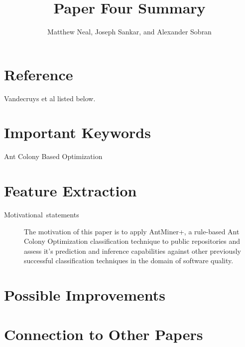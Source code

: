 \documentclass[english]{article}
\begin{document}
\title{Paper Four Summary}


\author{Matthew Neal, Joseph Sankar, and Alexander Sobran}

\maketitle

\section*{Reference}

Vandecruys et al \cite{Vandecruys08} listed below.


\section*{Important Keywords}
\begin{description}
\item [{Ant Colony Based Optimization}] 
\end{description}

\section*{Feature Extraction}
\begin{description}
\item [{Motivational~statements}] The motivation of this paper is to apply AntMiner+, a rule-based Ant Colony Optimization classification technique to public repositories and assess it's prediction and inference capabilities against other previously successful classification techniques in the domain of software quality.
\end{description}



\section*{Possible Improvements}


\section*{Connection to Other Papers}





\end{document}

